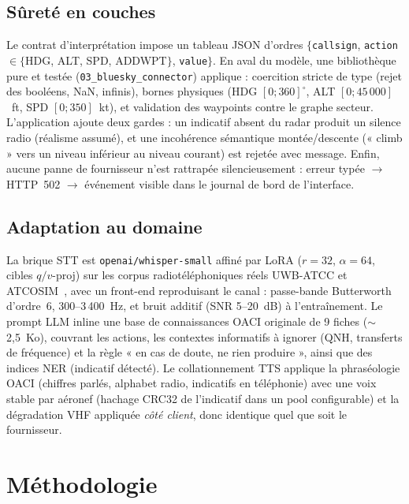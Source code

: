 \documentclass[10pt,a4paper]{article}
\newcommand{\syst}[1]{\texttt{#1}}
\begin{document}
\subsection{Sûreté en couches}
\label{sec:surete}

Le contrat d'interprétation impose un tableau JSON d'ordres
$\{$\syst{callsign}, \syst{action}$\in\{$HDG, ALT, SPD, ADDWPT$\}$,
\syst{value}$\}$. En aval du modèle, une bibliothèque pure et testée
(\syst{03\_bluesky\_connector}) applique : coercition stricte de type (rejet
des booléens, NaN, infinis), bornes physiques (HDG $[0;360]^\circ$, ALT
$[0;45\,000]$~ft, SPD $[0;350]$~kt), et validation des waypoints contre le
graphe secteur. L'application ajoute deux gardes : un indicatif absent du
radar produit un silence radio (réalisme assumé), et une incohérence
sémantique montée/descente (« climb » vers un niveau inférieur au niveau
courant) est rejetée avec message. Enfin, aucune panne de fournisseur n'est
rattrapée silencieusement : erreur typée $\rightarrow$ HTTP~502 $\rightarrow$
événement visible dans le journal de bord de l'interface.

\subsection{Adaptation au domaine}

La brique STT est \syst{openai/whisper-small} affiné par LoRA ($r=32$,
$\alpha=64$, cibles $q/v$-proj) sur les corpus radiotéléphoniques réels
UWB-ATCC et ATCOSIM~\cite{uwbatcc,atcosim}, avec un front-end reproduisant le
canal : passe-bande Butterworth d'ordre~6, 300--3\,400~Hz, et bruit additif
(SNR 5--20~dB) à l'entraînement. Le prompt LLM inline une base de connaissances OACI originale de 9 fiches ($\sim$2,5~Ko), couvrant les actions, les contextes informatifs à ignorer (QNH, transferts de fréquence) et la règle « en cas de doute, ne rien produire », ainsi que des indices NER (indicatif détecté).
Le collationnement TTS applique la phraséologie OACI (chiffres parlés,
alphabet radio, indicatifs en téléphonie) avec une voix stable par aéronef
(hachage CRC32 de l'indicatif dans un pool configurable) et la dégradation
VHF appliquée \emph{côté client}, donc identique quel que soit le fournisseur.

\section{Méthodologie}
\label{sec:methodo}
\end{document}
